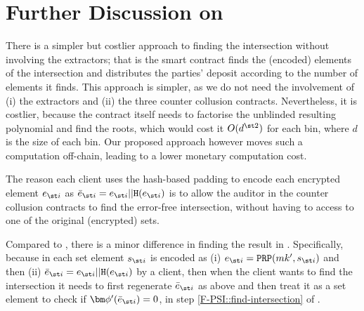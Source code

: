 

\section{Further Discussion on \withRew}\label{sec::Discussion-Anesidora}
There is a simpler but costlier approach to finding the intersection without involving the extractors; that is the smart contract finds the (encoded) elements of the intersection and distributes the parties' deposit according to the number of elements it finds. This approach is simpler, as we do not need the involvement of (i) the extractors and (ii) the three counter collusion contracts. Nevertheless, it is costlier, because the contract itself needs to factorise the unblinded resulting polynomial and find the roots, which would cost it $O(d^{\st 2})$ for each bin, where $d$ is the size of each bin. Our proposed approach however moves such a computation off-chain, leading to a lower monetary computation cost. 



The reason each client uses the hash-based padding to encode each encrypted element $e_{\st i}$  as $\bar{e}_{\st i} =e_{\st i} || \mathtt{H}(e_{\st i})$ is to allow the auditor in the counter collusion contracts to find the error-free intersection, without having to access to one of the original (encrypted) sets. 

Compared to \fpsi, there is a minor difference in finding the result in \epsi. Specifically, because in \epsi each set element  $s_{\st i}$ is encoded as  (i) $e_{\st i}=\mathtt{PRP}(mk', s_{\st i})$ and then (ii) $\bar{e}_{\st i} =e_{\st i} || \mathtt{H}(e_{\st i})$ by a client, then when the client wants to find the intersection it needs to first regenerate $\bar{e}_{\st i}$ as above and then treat it as a set element to check if  $\bm\phi'(\bar e_{\st i})=0$, in step \ref{F-PSI::find-intersection} of \fpsi.

%



